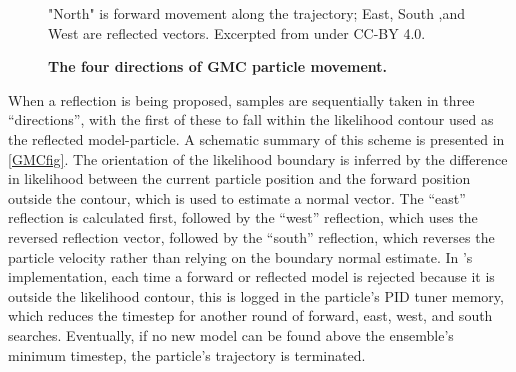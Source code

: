\begin{figure}[!h]
    \caption{{\bf The four directions of GMC particle movement.}} "North" is forward movement along the trajectory; East, South ,and West are reflected vectors. Excerpted from \cite{Skilling2019} under CC-BY 4.0.
    \label{GMCfig}
\end{figure}

When a reflection is being proposed, samples are sequentially taken in three ``directions'', with the first of these to fall within the likelihood contour used as the reflected model-particle. A schematic summary of this scheme is presented in \autoref{GMCfig}. The orientation of the likelihood boundary is inferred by the difference in likelihood between the current particle position and the forward position outside the contour, which is used to estimate a normal vector. The ``east'' reflection is calculated first, followed by the ``west'' reflection, which uses the reversed reflection vector, followed by the ``south'' reflection, which reverses the particle velocity rather than relying on the boundary normal estimate. In \hyperref[chap:GMC]{}'s implementation, each time a forward or reflected model is rejected because it is outside the likelihood contour, this is logged in the particle's PID tuner memory, which reduces the timestep for another round of forward, east, west, and south searches. Eventually, if no new model can be found above the ensemble's minimum timestep, the particle's trajectory is terminated.

\FloatBarrier

